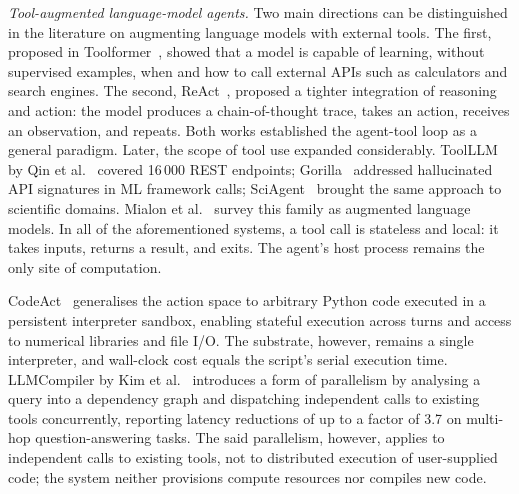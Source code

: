 

\textit{Tool-augmented language-model agents.}\quad
Two main directions can be distinguished in the literature on augmenting language models with external tools. The first, proposed in Toolformer~\cite{schick2023toolformer}, showed that a model is capable of learning, without supervised examples, when and how to call external APIs such as calculators and search engines. The second, ReAct~\cite{yao2023react}, proposed a tighter integration of reasoning and action: the model produces a chain-of-thought trace, takes an action, receives an observation, and repeats. Both works established the agent-tool loop as a general paradigm. Later, the scope of tool use expanded considerably. ToolLLM by Qin et al.~\cite{qin2024toolllm} covered 16\,000 REST endpoints; Gorilla~\cite{patil2023gorilla} addressed hallucinated API signatures in ML framework calls; SciAgent~\cite{ma2024sciagent} brought the same approach to scientific domains. Mialon et al.~\cite{mialon2023augmented} survey this family as augmented language models. In all of the aforementioned systems, a tool call is stateless and local: it takes inputs, returns a result, and exits. The agent's host process remains the only site of computation.

CodeAct~\cite{wang2024codeact} generalises the action space to arbitrary Python code executed in a persistent interpreter sandbox, enabling stateful execution across turns and access to numerical libraries and file I/O. The substrate, however, remains a single interpreter, and wall-clock cost equals the script's serial execution time. LLMCompiler by Kim et al.~\cite{kim2024llmcompiler} introduces a form of parallelism by analysing a query into a dependency graph and dispatching independent calls to existing tools concurrently, reporting latency reductions of up to a factor of 3.7 on multi-hop question-answering tasks. The said parallelism, however, applies to independent calls to existing tools, not to distributed execution of user-supplied code; the system neither provisions compute resources nor compiles new code.

